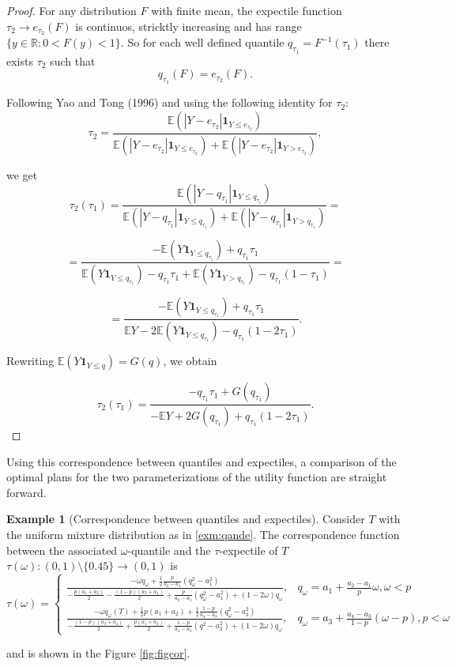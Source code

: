 \documentclass[
]{article}
\theoremstyle{definition}
\theoremstyle{definition}
\newtheorem{example}{Example}[section]
\theoremstyle{definition}
\theoremstyle{definition}
\theoremstyle{remark}
\begin{document}
\begin{proof}
For any distribution \(F\) with finite mean, the expectile function \(\tau_2\rightarrow e_{\tau_2}(F)\) is continuos, stricktly increasing and has range \(\{y\in\mathbb R: 0<F(y)<1\}\). So for each well defined quantile \(q_{\tau_1}=F^{-1}(\tau_1)\) there exists \(\tau_2\) such that
\[q_{\tau_1}(F) = e_{\tau_2}(F).\]

Following Yao and Tong (1996) and using the following identity for \(\tau_2\):
\[\tau_2 = \frac{\mathbb E(|Y-e_{\tau_2}|\mathbf 1_{Y\leq e_{\tau_2}})}{\mathbb E(|Y-e_{\tau_2}|\mathbf 1_{Y\leq e_{\tau_2}}) + \mathbb E(|Y-e_{\tau_2}|\mathbf 1_{Y> e_{\tau_2}})},\]

we get
\[\tau_2 (\tau_1) = \frac{\mathbb E(|Y-q_{\tau_1}|\mathbf 1_{Y\leq q_{\tau_1}})}{\mathbb E(|Y-q_{\tau_1}|\mathbf 1_{Y\leq q_{\tau_1}}) + \mathbb E(|Y-q_{\tau_1}|\mathbf 1_{Y> q_{\tau_1}})}=\]

\[= \frac{-\mathbb E(Y\mathbf 1_{Y\leq q_{\tau_1}})+q_{\tau_1}\tau_1}{\mathbb E(Y\mathbf 1_{Y\leq q_{\tau_1}})-q_{\tau_1}\tau_1 + \mathbb E(Y\mathbf 1_{Y> q_{\tau_1}})-q_{\tau_1}(1-\tau_1)}=\]

\[= \frac{-\mathbb E(Y\mathbf 1_{Y\leq q_{\tau_1}})+q_{\tau_1}\tau_1}{\mathbb EY - 2\mathbb E(Y\mathbf 1_{Y\leq q_{\tau_1}})-q_{\tau_1}(1-2\tau_1)}.\]

Rewriting \(\mathbb E(Y\mathbf 1_{Y\leq q}) = G(q)\), we obtain

\[\tau_2 (\tau_1) = \frac{-q_{\tau_1}\tau_1 + G(q_{\tau_1})}{-\mathbb EY + 2G(q_{\tau_1})+q_{\tau_1}(1-2\tau_1)}.\]
\end{proof}

Using this correspondence between quantiles and expectiles, a comparison of the optimal plans for the two parameterizations of the utility function are straight forward.

\begin{example}[Correspondence between quantiles and expectiles]
\protect\hypertarget{exm:corrqe}{}\label{exm:corrqe}Consider \(T\) with the uniform mixture distribution as in \ref{exm:qande}. The correspondence function between the associated \(\omega\)-quantile and the \(\tau\)-expectile of \(T\) \(\tau(\omega):(0,1)\setminus\{0.45\}\rightarrow(0,1)\) is
\[\tau(\omega)=\begin{cases}
\frac{-\omega q_\omega+ \frac 12 \frac p{a_2-a_1}(q_\omega^2-a_1^2)}{-\frac{p(a_1+a_2)}{2}-\frac{(1-p)(a_3+a_4)}{2} +\frac p{a_2-a_1}(q_\omega^2-a_1^2) + (1-2\omega)q_\omega},&q_\omega= a_1 + \frac{a_2-a_1} p\omega, \omega <p\\
\frac{-\omega q_\omega(T) + \frac 12 p(a_1+a_2) + \frac 12 \frac {1-p}{a_4-a_3}(q_\omega^2-a_3^2)}{-\frac{(1-p)(a_3+a_4)}{2} + \frac{p(a_1+a_2)}2 + \frac {1-p}{a_4-a_3}(q^2-a_3^2) + (1-2\omega)q_\omega},&q_\omega = a_3 + \frac{a_4-a_3}{1-p}(\omega-p), p<\omega
\end{cases}\]

and is shown in the Figure \ref{fig:figcor}.
\end{example}
\end{document}
